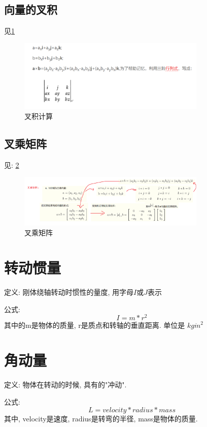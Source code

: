 \documentclass[UTF8,a4paper,10pt,nocolorlinks]{ctexart}
\begin{document}
\subsection{向量的叉积}
见\ref{equ_4}
\begin{figure}[htpb]
  \centering
  \includegraphics[width=0.8\textwidth]{picture/crossProduct.png}
  \caption{叉积计算}
  \label{equ_4}
\end{figure}
\subsection{叉乘矩阵}
见: \ref{equ_cproduct}
\begin{figure}[htpb]
  \centering
  \includegraphics[width=0.8\textwidth]{picture/cproductMat.png}
  \caption{叉乘矩阵}
  \label{equ_cproduct}
\end{figure}

\section{转动惯量}
定义: 刚体绕轴转动时惯性的量度, 用字母$I$或$J$表示
\par 公式:
\begin{equation}
  I = m * r^{2} \nonumber
\end{equation}
其中的m是物体的质量, r是质点和转轴的垂直距离. 单位是 $kg \dot m^{2}$
\section{角动量}
定义: 物体在转动的时候, 具有的"冲动".
\par 公式: 
\begin{equation}
  L = velocity * radius * mass
\end{equation}
其中, velocity是速度, radius是转弯的半径, mass是物体的质量.
\end{document}
